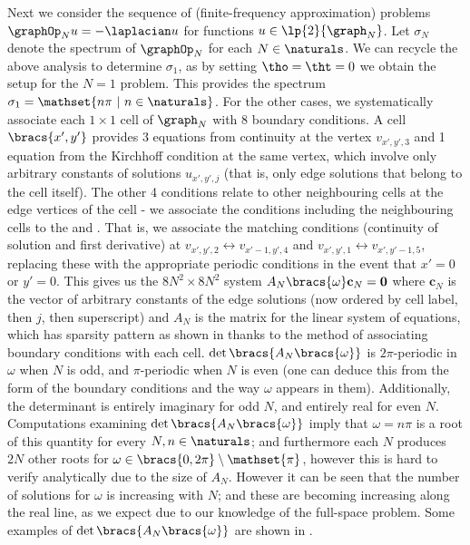 Next we consider the sequence of (finite-frequency approximation) problems $\graphOp_{N}u = -\laplacian u$ for functions $u\in\lp{2}{\graph_{N}}$.
Let $\sigma_{N}$ denote the spectrum of $\graphOp_{N}$ for each $N\in\naturals$.
We can recycle the above analysis to determine $\sigma_{1}$, as by setting $\tho=\tht=0$ we obtain the setup for the $N=1$ problem.
This provides the spectrum $\sigma_{1} = \mathset{n\pi \text{ }\vert\text{ } n\in\naturals}$.
For the other cases, we systematically associate each $1\times1$ cell of $\graph_{N}$ with 8 boundary conditions.
A cell $\bracs{x',y'}$ provides 3 equations from continuity at the vertex $v_{x',y',3}$ and 1 equation from the Kirchhoff condition at the same vertex, which involve only arbitrary constants of solutions $u_{x',y',j}$ (that is, only edge solutions that belong to the cell itself).
The other 4 conditions relate to other neighbouring cells at the edge vertices of the cell - we associate the conditions including the neighbouring cells to the  and .
That is, we associate the matching conditions (continuity of solution and first derivative) at $v_{x',y',2}\leftrightarrow v_{x'-1,y',4}$ and $v_{x',y',1}\leftrightarrow v_{x',y'-1,5}$, replacing these with the appropriate periodic conditions in the event that $x'=0$ or $y'=0$.
This gives us the $8N^{2}\times8N^{2}$ system $A_{N}\bracs{\omega}\mathbf{c}_{N} = \mathbf{0}$ where $\mathbf{c}_{N}$ is the vector of arbitrary constants of the edge solutions (now ordered by cell label, then $j$, then superscript) and $A_{N}$ is the matrix for the linear system of equations, which has sparsity pattern as shown in  thanks to the method of associating boundary conditions with each cell.
$\det\bracs{A_{N}\bracs{\omega}}$ is $2\pi$-periodic in $\omega$ when $N$ is odd, and $\pi$-periodic when $N$ is even (one can deduce this from the form of the boundary conditions and the way $\omega$ appears in them).
Additionally, the determinant is entirely imaginary for odd $N$, and entirely real for even $N$.
Computations examining $\det\bracs{A_{N}\bracs{\omega}}$ imply that $\omega=n\pi$ is a root of this quantity for every $N, n\in\naturals$; and furthermore each $N$ produces $2N$ other roots for $\omega\in\bracs{0,2\pi}\setminus\mathset{\pi}$, however this is hard to verify analytically due to the size of $A_{N}$.
However it can be seen that the number of solutions for $\omega$ is increasing with $N$; and these are becoming increasing  along the real line, as we expect due to our knowledge of the full-space problem.
Some examples of $\det\bracs{A_{N}\bracs{\omega}}$ are shown in .
